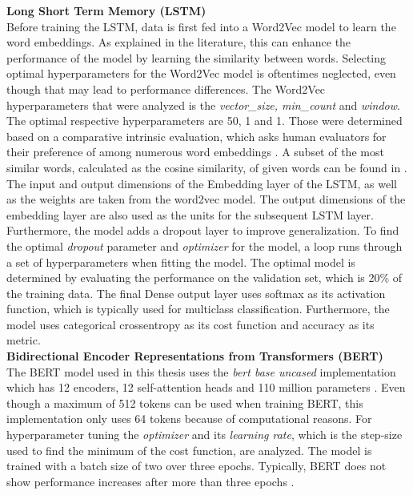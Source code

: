 \documentclass[11pt, a4paper]{article}
\begin{document}
\noindent\textbf{Long Short Term Memory (LSTM)}\\
Before training the LSTM, data is first fed into a Word2Vec model to learn the word embeddings. As explained in the literature, this can enhance the performance of the model by learning the similarity between words.
Selecting optimal hyperparameters for the Word2Vec model is oftentimes neglected, even though that may lead to performance differences.
The Word2Vec hyperparameters that were analyzed is the \emph{vector\_size, min\_count} and \emph{window}. The optimal respective hyperparameters are 50, 1 and 1. Those were determined based on a comparative intrinsic evaluation,
which asks human evaluators for their preference of among numerous word embeddings \citep{schnabel2015embeddings}.
A subset of the most similar words, calculated as the cosine similarity, of given words can be found in .
The input and output dimensions of the Embedding layer of the LSTM, as well as the weights are taken from the word2vec model.
The output dimensions of the embedding layer are also used as the units for the subsequent LSTM layer. Furthermore, the model adds a dropout layer to improve generalization. To find the optimal \emph{dropout} parameter and \emph{optimizer} for the model,
a loop runs through a set of hyperparameters when fitting the model. The optimal model is determined by evaluating the performance on the validation set, which is 20\% of the training data. 
The final Dense output layer uses softmax as its activation function, which is typically used for multiclass classification. 
Furthermore, the model uses categorical crossentropy as its cost function and accuracy as its metric.\\

\noindent\textbf{Bidirectional Encoder Representations from Transformers (BERT)}\\
The BERT model used in this thesis uses the \emph{bert base uncased} implementation which has 12 encoders, 12 self-attention heads and
110 million parameters \citep{devlin2019bert}. Even though a maximum of 512 tokens can be used when training BERT, this implementation only uses 64 tokens because of computational reasons.
For hyperparameter tuning the \emph{optimizer} and its \emph{learning rate}, which is the step-size used to find the minimum of the cost function, are analyzed.
The model is trained with a batch size of two over three epochs. Typically, BERT does not show performance increases after more than three epochs \citep{lim2020fine}.\\
\end{document}
